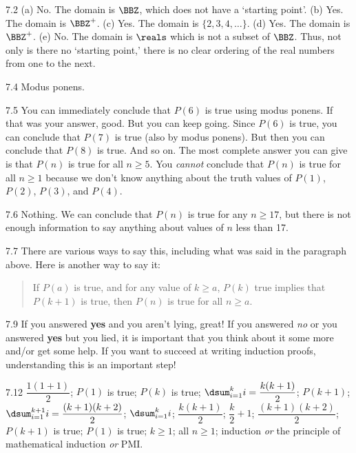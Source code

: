 \begin{Answer}{7.2}
(a) No.  The domain is $\BBZ$, which does not have a `starting point'.
(b) Yes.  The domain is $\BBZ^+$.
(c) Yes.  The domain is $\{2,3,4,\ldots\}$.
(d) Yes.  The domain is $\BBZ^+$.
(e) No.
The domain is $\reals$ which is not a subset of $\BBZ$.
Thus, not only is there no `starting point,'
there is no clear ordering of the real numbers from one to the next.
\end{Answer}
\begin{Answer}{7.4}
Modus ponens.
\end{Answer}
\begin{Answer}{7.5}
You can immediately conclude that $P(6)$ is true using
modus ponens.  If that was your answer, good.
But you can keep going.  Since $P(6)$ is true,
you can conclude that $P(7)$ is true (also by modus ponens).
But then you can conclude that $P(8)$ is true.
And so on.  The most complete answer you can give is that
$P(n)$ is true for all $n\geq 5$.
You {\em cannot} conclude that $P(n)$ is true for
all $n\geq 1$ because we don't know anything about
the truth values of $P(1)$, $P(2)$, $P(3)$, and $P(4)$.
\end{Answer}
\begin{Answer}{7.6}
Nothing. We can conclude that $P(n)$ is true for any $n\geq 17$,
but there is not enough information to say anything about values of $n$
less than 17.
\end{Answer}
\begin{Answer}{7.7}
There are various ways to say this, including what was said in the paragraph above.
Here is another way to say it:
\begin{quote}
If $P(a)$ is true, and for any value of $k\geq a$,
$P(k)$ true implies that $P(k+1)$ is true, then $P(n)$ is true for all $n\geq a$.
\end{quote}
\end{Answer}
\begin{Answer}{7.9}
If you answered {\bf yes} and you aren't lying, great!  If you
answered {\em no} or you answered {\bf yes} but you lied,
it is important that you think about it some more and/or
get some help.  If you want to succeed at writing induction
proofs, understanding this is an important step!
\end{Answer}
\begin{Answer}{7.12}
$\dfrac{1(1+1)}{2}$;
$P(1)$ is true;
$P(k)$ is true;
$\dsum_{i=1}^{k} i = \dfrac{k(k+1)}{2}$;
$P(k+1)$;
$\dsum_{i=1}^{k+1} i = \dfrac{(k+1)(k+2)}{2}$;
$\dsum_{i=1}^{k} i$;
$\dfrac{k(k+1)}{2}$;
$\dfrac{k}{2}+1$;
$\dfrac{(k+1)(k+2)}{2}$;
$P(k+1)$ is true;
$P(1)$ is true;
$k\geq 1$;
all $n\geq 1$;
induction {\em or} the principle of mathematical induction {\em or} PMI.
\end{Answer}
